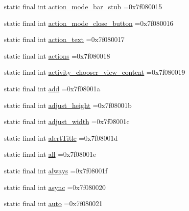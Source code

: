 \begin{DoxyCompactItemize}
\item 
static final int \mbox{\hyperlink{classbr_1_1unb_1_1cic_1_1mp_1_1marketmaster_1_1test_1_1R_1_1id_a1067e3752febcf1602ca78ff1d75de9d}{action\+\_\+mode\+\_\+bar\+\_\+stub}} =0x7f080015
\item 
static final int \mbox{\hyperlink{classbr_1_1unb_1_1cic_1_1mp_1_1marketmaster_1_1test_1_1R_1_1id_a877bc9506ca5c0ca972ab32066532820}{action\+\_\+mode\+\_\+close\+\_\+button}} =0x7f080016
\item 
static final int \mbox{\hyperlink{classbr_1_1unb_1_1cic_1_1mp_1_1marketmaster_1_1test_1_1R_1_1id_aa511ec61e2de1e224b92b340efbf650c}{action\+\_\+text}} =0x7f080017
\item 
static final int \mbox{\hyperlink{classbr_1_1unb_1_1cic_1_1mp_1_1marketmaster_1_1test_1_1R_1_1id_aa26eb8916439f213d622c5b203efd3bf}{actions}} =0x7f080018
\item 
static final int \mbox{\hyperlink{classbr_1_1unb_1_1cic_1_1mp_1_1marketmaster_1_1test_1_1R_1_1id_a82f12169059617742646952d29e3ccc1}{activity\+\_\+chooser\+\_\+view\+\_\+content}} =0x7f080019
\item 
static final int \mbox{\hyperlink{classbr_1_1unb_1_1cic_1_1mp_1_1marketmaster_1_1test_1_1R_1_1id_a26bebb4ea9e365a31984ce8f0e111dfb}{add}} =0x7f08001a
\item 
static final int \mbox{\hyperlink{classbr_1_1unb_1_1cic_1_1mp_1_1marketmaster_1_1test_1_1R_1_1id_a7dbccc3b8776e018b4d2bb4d468c15b5}{adjust\+\_\+height}} =0x7f08001b
\item 
static final int \mbox{\hyperlink{classbr_1_1unb_1_1cic_1_1mp_1_1marketmaster_1_1test_1_1R_1_1id_af526569e4471e4532f55127c52637295}{adjust\+\_\+width}} =0x7f08001c
\item 
static final int \mbox{\hyperlink{classbr_1_1unb_1_1cic_1_1mp_1_1marketmaster_1_1test_1_1R_1_1id_a98960bfd53a48ab5a20b418ca7c4efe8}{alert\+Title}} =0x7f08001d
\item 
static final int \mbox{\hyperlink{classbr_1_1unb_1_1cic_1_1mp_1_1marketmaster_1_1test_1_1R_1_1id_a94bdae5023036e3e4057656f7579dd91}{all}} =0x7f08001e
\item 
static final int \mbox{\hyperlink{classbr_1_1unb_1_1cic_1_1mp_1_1marketmaster_1_1test_1_1R_1_1id_a55da54f1441eaf3ff051bf9dfa52b83f}{always}} =0x7f08001f
\item 
static final int \mbox{\hyperlink{classbr_1_1unb_1_1cic_1_1mp_1_1marketmaster_1_1test_1_1R_1_1id_afa5b85b3dfb73276849854d0e789d8dc}{async}} =0x7f080020
\item 
static final int \mbox{\hyperlink{classbr_1_1unb_1_1cic_1_1mp_1_1marketmaster_1_1test_1_1R_1_1id_ad294e0444e009f82ed9c272c0fc6300c}{auto}} =0x7f080021

\end{DoxyCompactItemize}
